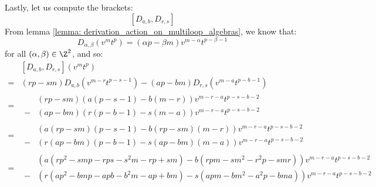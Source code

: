 Lastly, let us compute the brackets:
                        $$[D_{a, b}, D_{r, s}]$$
                    From lemma \ref{lemma: derivation_action_on_multiloop_algebras}, we know that:
                        $$D_{\alpha, \beta}(v^m t^p) = (\alpha p - \beta m) v^{m - \alpha} t^{p - \beta - 1}$$
                    for all $(\alpha, \beta) \in \Z^2$, and so:
                        $$
                            \begin{aligned}
                                & [D_{a, b}, D_{r, s}](v^m t^p)
                                \\
                                = & (rp - sm) D_{a, b}\left( v^{m - r} t^{p - s - 1} \right) - (ap - bm) D_{r, s}\left( v^{m - a} t^{p - b - 1} \right)
                                \\
                                = &
                                \begin{aligned}
                                    & (rp - sm) ( a(p - s - 1) - b(m - r) ) v^{m - r - a} t^{p - s - b - 2}
                                    \\
                                    - & (ap - bm) ( r(p - b - 1) - s(m - a) ) v^{m - r - a} t^{p - s - b - 2}
                                \end{aligned}
                                \\
                                = &
                                \begin{aligned}
                                    & \left( a (rp - sm)(p - s - 1) - b (rp - sm) (m - r) \right) v^{m - r - a} t^{p - s - b - 2}
                                    \\
                                    - & \left( r (ap - bm) (p - b - 1) - s (ap - bm) (m - a) \right) v^{m - r - a} t^{p - s - b - 2}
                                \end{aligned}
                                \\
                                = &
                                \begin{aligned}
                                    & \left( a ( rp^2 - smp - rps - s^2m - rp + sm ) - b ( rpm - sm^2 - r^2p - smr ) \right) v^{m - r - a} t^{p - s - b - 2}
                                    \\
                                    - & \left( r ( ap^2 - bmp - apb - b^2m - ap + bm ) - s ( apm - bm^2 - a^2p - bma ) \right) v^{m - r - a} t^{p - s - b - 2}
                                \end{aligned}

\end{aligned}$$
